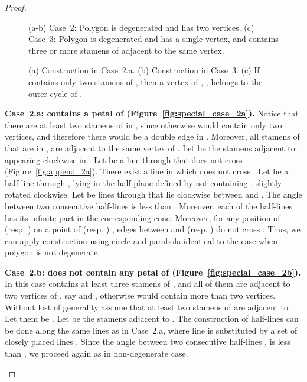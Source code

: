 \documentclass{llncs}
\begin{document}
\begin{proof}
\begin{description}
\begin{figure}[tbh]
 \centering
 \hspace{+1cm}
 \hspace{+1cm}
 \caption{(a-b) Case~2: Polygon  is degenerated and has two vertices. (c) Case~3: Polygon  is degenerated and has a single vertex, and  contains three or more stamens of  adjacent to the same vertex.}
\end{figure}


\begin{figure}[tbh]
 \centering
 \hspace{+1cm}
 \caption{(a) Construction in Case~2.a. (b) Construction in Case~3. (c) If   contains only two stamens of , then a vertex of , , belongs to the outer cycle of .}
\end{figure}

{\bf Case~2.a:   contains a petal  of  (Figure~\ref{fig:special_case_2a}).}  
Notice that there are at least two stamens of  in  , since otherwise   would contain only two vertices, and therefore there would be a double edge in . Moreover, all stamens of  that are in , are adjacent to the same vertex  of . Let  be the stamens adjacent to , appearing clockwise in . Let  be a line through  that does not cross  (Figure~\ref{fig:append_2a}). There exist a line  in  which does not cross .
Let  be a half-line through ,  lying in the half-plane defined by  not containing , slightly rotated clockwise. Let  be lines through  that lie clockwise between  and . 
The angle between two consecutive half-lines  is less than . Moreover, each of the half-lines has its infinite part in the corresponding cone. Moreover, for any position of  (resp. ) on a point of  (resp. ) , edges between  and  (resp. ) do not cross . Thus, we can apply construction using circle  and parabola  identical to the case when polygon  is not degenerate.    

{\bf Case~2.b:   does not contain any petal of  (Figure~\ref{fig:special_case_2b}).}  
In this case  contains at least three stamens of , and all of them are adjacent to two vertices of , say  and , otherwise  would contain more than two vertices. Without lost of generality assume that at least two stamens of  are adjacent to . Let them be . Let  be the stamens adjacent to . The construction of half-lines  can be done along the same lines as in Case~2.a, where line  is substituted by a set of closely placed lines . Since the angle between two consecutive half-lines ,   is less than , we proceed again as in non-degenerate case.  


\end{description}
\end{proof}
\end{document}
